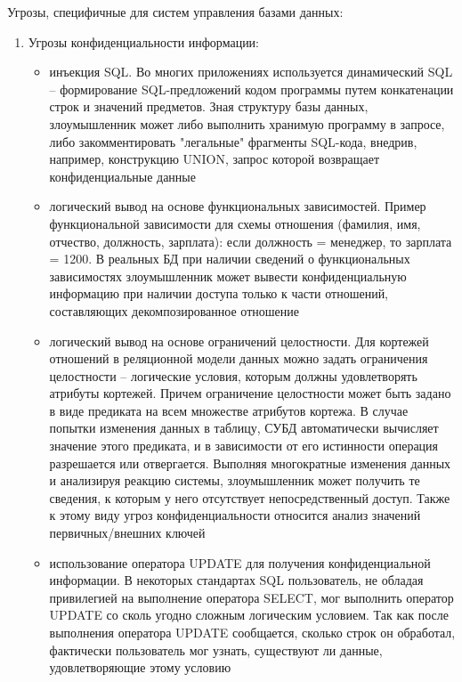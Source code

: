 Угрозы, специфичные для систем управления базами данных:
\begin{enumerate}
	\item Угрозы конфиденциальности информации:
		\begin{itemize}
			\item инъекция SQL. Во многих приложениях используется динамический SQL -- формирование SQL-предложений кодом программы путем конкатенации строк и значений предметов. Зная структуру базы данных, злоумышленник может либо выполнить хранимую программу в запросе, либо закомментировать "легальные" фрагменты SQL-кода, внедрив, например, конструкцию UNION, запрос которой возвращает конфиденциальные данные
			
			\item логический вывод на основе функциональных зависимостей. Пример функциональной зависимости для схемы отношения (фамилия, имя, отчество, должность, зарплата): если должность = менеджер, то зарплата = 1200. В реальных БД при наличии сведений о функциональных зависимостях злоумышленник может вывести конфиденциальную информацию при наличии доступа только к части отношений, составляющих декомпозированное отношение
			
			\item логический вывод на основе ограничений целостности. Для кортежей отношений в реляционной модели данных можно задать ограничения целостности – логические условия, которым должны удовлетворять атрибуты кортежей. Причем ограничение целостности может быть задано в виде предиката на всем множестве атрибутов кортежа. В случае попытки изменения данных в таблицу, СУБД автоматически вычисляет значение этого предиката, и в зависимости от его истинности операция разрешается или отвергается. Выполняя многократные изменения данных и анализируя реакцию системы, злоумышленник может получить те сведения, к которым у него отсутствует непосредственный доступ. Также к этому виду угроз конфиденциальности относится анализ значений первичных/внешних ключей
			
			\item использование оператора UPDATE для получения конфиденциальной информации. В некоторых стандартах SQL пользователь, не обладая привилегией на выполнение оператора SELECT, мог выполнить оператор UPDATE со сколь угодно сложным логическим условием. Так как после выполнения оператора UPDATE сообщается, сколько строк он обработал, фактически пользователь мог узнать, существуют ли данные, удовлетворяющие этому условию
		\end{itemize}
	

\end{enumerate}
